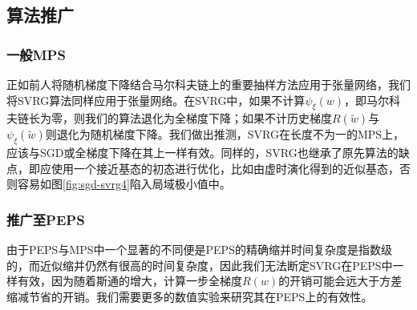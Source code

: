 \subsection{算法推广}
\subsubsection{一般MPS}

正如前人将随机梯度下降结合马尔科夫链上的重要抽样方法应用于张量网络，我们将SVRG算法同样应用于张量网络。在SVRG中，如果不计算$\psi_{\xi}(w)$，即马尔科夫链长为零，则我们的算法退化为全梯度下降；如果不计历史梯度$R(\tilde{w})$与$\psi_{\xi}(\tilde{w})$则退化为随机梯度下降。我们做出推测，SVRG在长度不为一的MPS上，应该与SGD或全梯度下降在其上一样有效。同样的，SVRG也继承了原先算法的缺点，即应使用一个接近基态的初态进行优化，比如由虚时演化得到的近似基态\cite{liuGradientOptimizationFinite2017}，否则容易如图\ref{fig:sgd-svrg4}陷入局域极小值中。

\subsubsection{推广至PEPS}

由于PEPS与MPS中一个显著的不同便是PEPS的精确缩并时间复杂度是指数级的，而近似缩并仍然有很高的时间复杂度，因此我们无法断定SVRG在PEPS中一样有效，因为随着斯通的增大，计算一步全梯度$R(w)$的开销可能会远大于方差缩减节省的开销。我们需要更多的数值实验来研究其在PEPS上的有效性。
